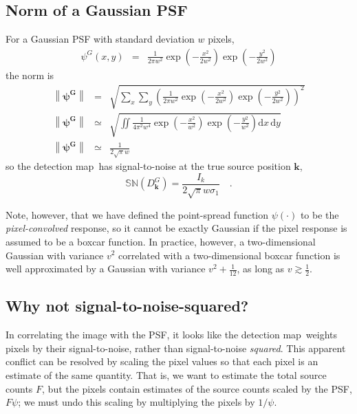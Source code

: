 \documentclass[11pt,letterpaper,linenumbers]{aastex7}
\newcommand{\detmap}{detection map}
\newcommand{\psf}{\psi}
\newcommand{\snr}[1]{\mathbb{SN}(#1)}
\newcommand{\norm}[1]{\left\lVert #1 \right\rVert}
\newcommand{\psfw}{w}
\renewcommand{\vec}[1]{\boldsymbol{#1}}
\newcommand{\kvec}{\vec{k}}
\begin{document}
\subsection{Norm of a Gaussian PSF}
\label{app:gaussnorm}
For a Gaussian PSF with standard deviation $\psfw$ pixels,
\begin{eqnarray}\displaystyle
\psf^G(x,y) &=& \frac{1}{2 \pi \psfw^2} \exp{\left(-\frac{x^2}{2 \psfw^2}\right)} \exp{\left(-\frac{y^2}{2 \psfw^2}\right)}
\end{eqnarray}
the norm is%
\begin{eqnarray}
\norm{\bm{\psf^G}} &=& \sqrt{ \sum_{x} \sum_{y} \left(\frac{1}{2 \pi \psfw^2} \exp{\left(-\frac{x^2}{2 \psfw^2}\right)} \exp{\left(-\frac{y^2}{2 \psfw^2}\right)} \right)^2} \\
\norm{\bm{\psf^G}} &\simeq& \sqrt{\iint \frac{1}{4 \pi^2 \psfw^4} \exp{\left(-\frac{x^2}{\psfw^2}\right)} \exp{\left(-\frac{y^2}{\psfw^2}\right)} \mathrm{d}x \, \mathrm{d}y} \\
\norm{\bm{\psf^G}} &\simeq& \frac{1}{2 \sqrt{\pi} \psfw}
\end{eqnarray}
so the \detmap\ has signal-to-noise at the true source position $\kvec$,
\begin{equation}
\snr{D_{\kvec}^G} = \frac{I_k}{2 \sqrt{\pi} \psfw \sigma_1 } \quad .
\label{eqn:sndsinglegauss}
\end{equation}

Note, however, that we have defined the point-spread function
$\psf(\cdot)$ to be the \emph{pixel-convolved} response, so it cannot
be exactly Gaussian if the pixel response is assumed to be a boxcar
function.  In practice, however, a two-dimensional Gaussian with
variance $v^2$ correlated with a two-dimensional boxcar function is
well approximated by a Gaussian with variance $v^2 + \frac{1}{12}$, as
long as $v \gtrsim \frac{1}{2}$.





\subsection{Why not signal-to-noise-squared?}
In correlating the image with the PSF, it looks like the
\detmap\ weights pixels by their signal-to-noise, rather than
signal-to-noise \emph{squared}.  This apparent conflict can be
resolved by scaling the pixel values so that each pixel is an estimate
of the same quantity.  That is, we want to estimate the total source
counts $F$, but the pixels contain estimates of the source counts
scaled by the PSF, $F \psf$; we must undo this scaling by multiplying
the pixels by $1/\psf$.
\end{document}
